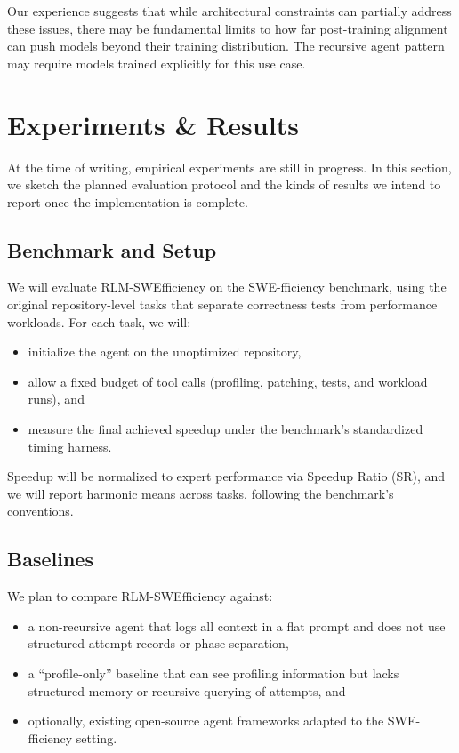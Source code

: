 \documentclass{article}
\theoremstyle{plain}
\theoremstyle{definition}
\theoremstyle{remark}
\begin{document}
Our experience suggests that while architectural constraints can partially address these issues, there may be fundamental limits to how far post-training alignment can push models beyond their training distribution. The recursive agent pattern may require models trained explicitly for this use case.

\section{Experiments \& Results}
\label{sec:experiments}
At the time of writing, empirical experiments are still in progress. In this section, we sketch the planned evaluation protocol and the kinds of results we intend to report once the implementation is complete.

\subsection{Benchmark and Setup}
We will evaluate RLM-SWEfficiency on the SWE-fficiency benchmark, using the original repository-level tasks that separate correctness tests from performance workloads. For each task, we will:
\begin{itemize}
    \item initialize the agent on the unoptimized repository,
    \item allow a fixed budget of tool calls (profiling, patching, tests, and workload runs), and
    \item measure the final achieved speedup under the benchmark's standardized timing harness.
\end{itemize}

Speedup will be normalized to expert performance via Speedup Ratio (SR), and we will report harmonic means across tasks, following the benchmark's conventions.

\subsection{Baselines}
We plan to compare RLM-SWEfficiency against:
\begin{itemize}
    \item a non-recursive agent that logs all context in a flat prompt and does not use structured attempt records or phase separation,
    \item a ``profile-only'' baseline that can see profiling information but lacks structured memory or recursive querying of attempts, and
    \item optionally, existing open-source agent frameworks adapted to the SWE-fficiency setting.
\end{itemize}
\end{document}
